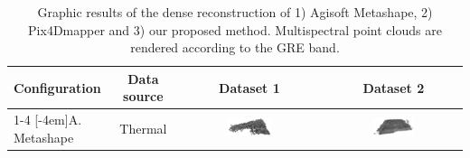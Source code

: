 \begin{table}[hb]
    \centering
    \caption{Graphic results of the dense reconstruction of 1) Agisoft Metashape, 2) Pix4Dmapper and 3) our proposed method. Multispectral point clouds are rendered according to the GRE band. }
    \label{table:visual_results}  
    \newcommand\imageTableSize{0.32\textwidth}
    \begin{tabular}{l|c|c|c}
    \toprule
    \textbf{Configuration} & \textbf{Data source} &\textbf{Dataset 1} & \textbf{Dataset 2}\\
    \cmidrule{1-4}
    \multirow{2}{*}[-4em]{A. Metashape} & Thermal & \multicolumn{1}{m{\imageTableSize}|}{\includegraphics[width=\imageTableSize]{figs/multi_thermal_projection/results/metashape/AgisoftThermalMarmolejo.png}} & \multicolumn{1}{m{\imageTableSize}}{\includegraphics[width=\imageTableSize]{figs/multi_thermal_projection/results/metashape/AgisoftThermalNovember.png}}\\

\end{tabular}
\end{table}
